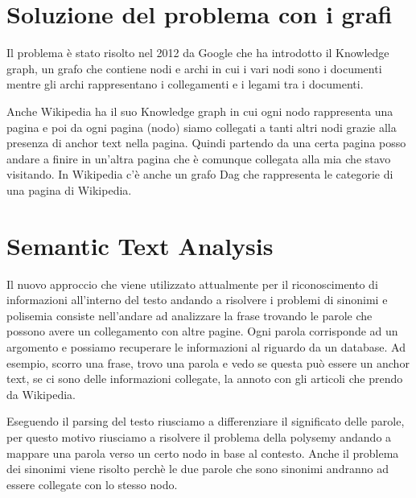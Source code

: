 \documentclass[14pt]{extreport}
\begin{document}
\section{Soluzione del problema con i grafi}

Il problema è stato risolto nel 2012 da Google che ha introdotto il Knowledge graph, un grafo che contiene nodi e archi in cui i vari nodi sono i documenti mentre gli archi rappresentano i collegamenti e i legami tra i documenti.

Anche Wikipedia ha il suo Knowledge graph in cui ogni nodo rappresenta una pagina e poi da ogni pagina (nodo) siamo collegati a tanti altri nodi grazie alla presenza di anchor text nella pagina. 
Quindi partendo da una certa pagina posso andare a finire in un'altra pagina che è comunque collegata alla mia che stavo visitando.
In Wikipedia c'è anche un grafo Dag che rappresenta le categorie di una pagina di Wikipedia.

\section{Semantic Text Analysis}

Il nuovo approccio che viene utilizzato attualmente per il riconoscimento di informazioni all'interno del testo andando a risolvere i problemi di sinonimi e polisemia consiste nell'andare ad analizzare la frase trovando le parole che possono avere un collegamento con altre pagine. Ogni parola corrisponde ad un argomento e possiamo recuperare le informazioni al riguardo da un database.
Ad esempio, scorro una frase, trovo una parola e vedo se questa può essere un anchor text, se ci sono delle informazioni collegate, la annoto con gli articoli che prendo da Wikipedia.

Eseguendo il parsing del testo riusciamo a differenziare il significato delle parole, per questo motivo riusciamo a risolvere il problema della polysemy andando a mappare una parola verso un certo nodo in base al contesto. Anche il problema dei sinonimi viene risolto perchè le due parole che sono sinonimi andranno ad essere collegate con lo stesso nodo.
\end{document}
